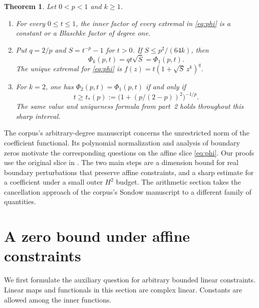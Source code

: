 \documentclass[11pt]{article}
\numberwithin{equation}{section}
\newtheorem{theorem}{Theorem}[section]
\theoremstyle{remark}
\begin{document}
\begin{theorem}\label{thm:main}
Let \(0<p<1\) and \(k\ge1\).
\begin{enumerate}
\item For every \(0\le t\le1\), the inner factor of every extremal in
\eqref{eq:phi} is a constant or a Blaschke factor of degree one.
\item Put \(q=2/p\) and \(S=t^{-p}-1\) for \(t>0\).
If \(S\le p^2/(64k)\), then
\[
  \Phi_k(p,t)=q t\sqrt S=\Phi_1(p,t).
\]
The unique extremal for \eqref{eq:phi} is
\(f(z)=t(1+\sqrt S\,z^k)^q\).
\item For \(k=2\), one has \(\Phi_2(p,t)=\Phi_1(p,t)\) if and only if
\[
  t\ge t_*(p):=\bigl(1+(p/(2-p))^2\bigr)^{-1/p}.
\]
The same value and uniqueness formula from part~2 holds throughout
this sharp interval.
\end{enumerate}
\end{theorem}

The corpus's arbitrary-degree manuscript \cite{CorpusHardy} concerns
the unrestricted norm of the coefficient functional. Its polynomial
normalization and analysis of boundary zeros motivate the corresponding
questions on the affine slice \eqref{eq:phi}. Our proofs use the original
slice in \cite{BGI}. The two main steps are a dimension bound for
real boundary perturbations that preserve affine constraints, and a sharp
estimate for a coefficient under a small outer \(H^2\) budget.
The arithmetic section takes the cancellation approach of the corpus's
Sondow manuscript \cite{CorpusSondow} to a different family of quantities.

\section{A zero bound under affine constraints}

We first formulate the auxiliary question for arbitrary bounded linear
constraints. Linear maps and functionals in this section are complex
linear. Constants are allowed among the inner functions.
\end{document}
